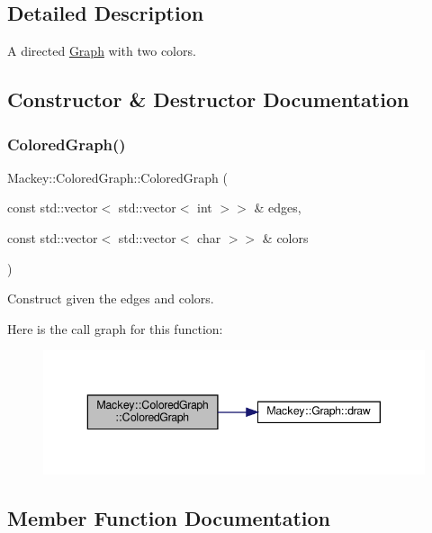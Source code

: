 \subsection{Detailed Description}
A directed \hyperlink{classMackey_1_1Graph}{Graph} with two colors. 

\subsection{Constructor \& Destructor Documentation}
\mbox{\label{classMackey_1_1ColoredGraph_a9ee26fcb36db12b5dd17702f4dc06d25}} 
\subsubsection{\texorpdfstring{Colored\+Graph()}{ColoredGraph()}}
{\footnotesize\ttfamily Mackey\+::\+Colored\+Graph\+::\+Colored\+Graph (\begin{DoxyParamCaption}\item[{const std\+::vector$<$ std\+::vector$<$ int $>$$>$ \&}]{edges,  }\item[{const std\+::vector$<$ std\+::vector$<$ char $>$$>$ \&}]{colors }\end{DoxyParamCaption})\hspace{0.3cm}{\ttfamily [inline]}}



Construct given the edges and colors. 

Here is the call graph for this function\+:\nopagebreak
\begin{figure}[H]
\begin{center}
\leavevmode
\includegraphics[width=343pt]{classMackey_1_1ColoredGraph_a9ee26fcb36db12b5dd17702f4dc06d25_cgraph}
\end{center}
\end{figure}


\subsection{Member Function Documentation}
\mbox{\label{classMackey_1_1ColoredGraph_a8ed05073805b34a0087a7ed94e889694}} 
